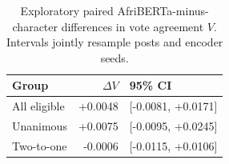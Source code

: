 \begin{table}[t]
\centering
\footnotesize
\caption{Exploratory paired AfriBERTa-minus-character differences in vote agreement $V$. Intervals jointly resample posts and encoder seeds.}
\label{tab:votecontrasts}
\begin{tabular}{lrl}
\toprule
Group & $\Delta V$ & 95\% CI \\
\midrule
All eligible & +0.0048 & [-0.0081, +0.0171] \\
Unanimous & +0.0075 & [-0.0095, +0.0245] \\
Two-to-one & -0.0006 & [-0.0115, +0.0106] \\
\bottomrule
\end{tabular}
\end{table}
